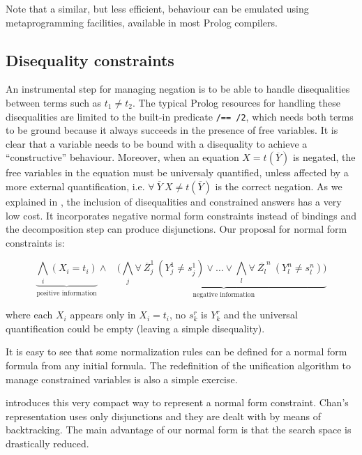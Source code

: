 \documentclass{llncs}
\begin{document}
Note that a similar, but less efficient, behaviour can be emulated
using metaprogramming facilities, available in most Prolog compilers.
 


\subsection{Disequality constraints}
\label{disequality}

An instrumental step for managing negation is to be able to handle
disequalities between terms such as $t_1 \neq t_2$.  The typical
Prolog resources for handling these disequalities are limited to the
built-in predicate {\tt /== /2}, which needs both terms to be ground
because it always succeeds in the presence of free variables.  It is
clear that a variable needs to be bound with a disequality to achieve
a ``constructive'' behaviour.  Moreover, when an equation $X =
t(\overline{Y})$ is negated, the free variables in the equation must
be universaly quantified, unless affected by a more external
quantification, i.e. $\forall~ \overline{Y}~X \neq t(\overline{Y})$ is
the correct negation.  As we explained in \cite{SusanaPADL2000}, the
inclusion of disequalities and constrained answers has a very low
cost. It incorporates negative normal form constraints instead of
bindings and the decomposition step can produce disjunctions. Our
proposal for normal form constraints is:

\[ \underbrace{\bigwedge_i (X_i = t_i)}_{\mbox{positive information}} \wedge~~~~ ( \underbrace{\bigwedge_j \forall~ \overline{Z}_j^1~(Y_j^1 \neq s_j^1) \vee \ldots \vee \bigwedge_l \forall~ \overline{Z_l}^n~(Y_l^n \neq s_l^n) ) }_{\mbox{negative information}} \]

\noindent
where each $X_i$ appears only in $X_i = t_i$, no $s_k^r$ is $Y_k^r$
and the universal quantification could be empty (leaving a simple
disequality).

It is easy to see that some normalization rules can be defined for a
normal form formula from any initial formula. The redefinition of the
unification algorithm to manage constrained variables is also a simple
exercise.

\cite{Moreno1} introduces this very compact way to represent a normal
form constraint.  Chan's representation uses only disjunctions and
they are dealt with by means of backtracking. The main advantage of our
normal form is that the search space is drastically reduced.
\end{document}
